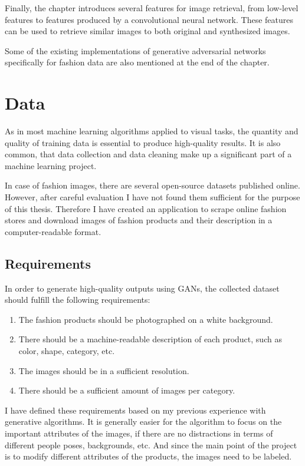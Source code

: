 \documentclass[12pt]{report}
\begin{document}
Finally, the chapter introduces several features for image retrieval, from low-level features to features produced by a convolutional neural network. These features can be used to retrieve similar images to both original and synthesized images.

Some of the existing implementations of generative adversarial networks specifically for fashion data are also mentioned at the end of the chapter.

\section{Data} \label{sec:data}
As in most machine learning algorithms applied to visual tasks, the quantity and quality of training data is essential to produce high-quality results. It is also common, that data collection and data cleaning make up a significant part of a machine learning project.

In case of fashion images, there are several open-source datasets published online. However, after careful evaluation I have not found them sufficient for the purpose of this thesis. Therefore I have created an application to scrape online fashion stores and download images of fashion products and their description in a computer-readable format.

\subsection{Requirements}

In order to generate high-quality outputs using GANs, the collected dataset should fulfill the following requirements:
\begin{enumerate}
\item The fashion products should be photographed on a white background. 
\item There should be a machine-readable description of each product, such as color, shape, category, etc. 
\item The images should be in a sufficient resolution.
\item There should be a sufficient amount of images per category.

\end{enumerate}
I have defined these requirements based on my previous experience with generative algorithms. It is generally easier for the algorithm to focus on the important attributes of the images, if there are no distractions in terms of different people poses, backgrounds, etc. And since the main point of the project is to modify different attributes of the products, the images need to be labeled.
\end{document}
